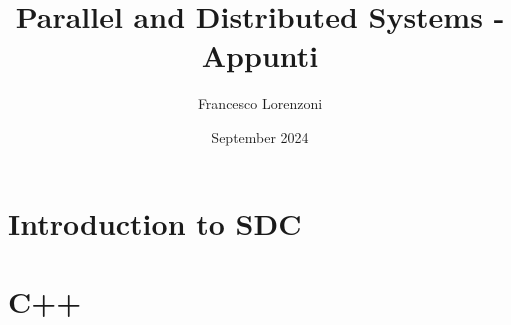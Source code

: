 
\usepackage{lstfiracode}
\lstset{
   style=FiraCodeStyle,   %
   language=C++,
}

\title{Parallel and Distributed Systems - Appunti}
\author{Francesco Lorenzoni}
\date{September 2024}


\makeatletter
\renewcommand{\l@section}{\@dottedtocline{1}{1.5em}{2.6em}}
\renewcommand{\l@subsection}{\@dottedtocline{2}{2.5em}{3.6em}}
\renewcommand{\l@subsubsection}{\@dottedtocline{3}{3.5em}{4.5em}}
\makeatother
{} %



\doparttoc[n]

\maketitle
\tableofcontents

\part{Introduction to SDC}
\parttoc







\part{C++}
\parttoc





